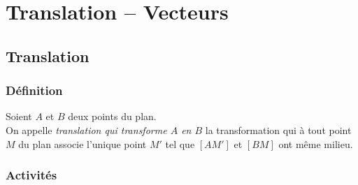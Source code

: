 \chapter{Translation -- Vecteurs} \label{vecteurs}
\minitoc

\fancyhead{} %
\fancyhead[LE,RO]{\footnotesize \em \rightmark} %

    \fancyfoot{}
    \fancyfoot[LE,RO]{\textbf{\thepage}}


\section{Translation}

\subsection{D\'efinition}

\begin{definition*}
 Soient $A$ et $B$ deux points du plan.\\
  On appelle \emph{translation qui transforme $A$ en $B$} la transformation qui \`a tout point $M$ du plan associe l'unique point $M'$ tel que $[AM']$ et $[BM]$ ont m\^eme milieu.
\end{definition*}


\subsection{Activit\'es}

